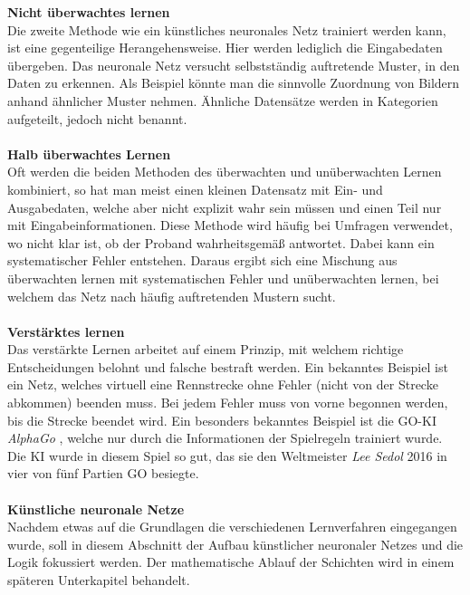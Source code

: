 \documentclass[a4paper,12pt,oneside]{article}
\begin{document}
\textbf{Nicht überwachtes lernen}\\
Die zweite Methode wie ein künstliches neuronales Netz trainiert werden kann, ist eine gegenteilige Herangehensweise. Hier werden lediglich die Eingabedaten übergeben. Das neuronale Netz versucht selbstständig auftretende Muster, in den Daten zu erkennen. Als Beispiel könnte man die sinnvolle Zuordnung von Bildern anhand ähnlicher Muster nehmen. Ähnliche Datensätze werden in Kategorien aufgeteilt, jedoch nicht benannt.\\\\
\textbf{Halb überwachtes Lernen}\\
Oft werden die beiden Methoden des überwachten und unüberwachten Lernen kombiniert, so hat man meist einen kleinen Datensatz mit Ein- und Ausgabedaten, welche aber nicht explizit wahr sein müssen und einen Teil nur mit Eingabeinformationen. Diese Methode wird häufig bei Umfragen verwendet, wo nicht klar ist, ob der Proband wahrheitsgemäß antwortet. Dabei kann ein systematischer Fehler entstehen. Daraus ergibt sich eine Mischung aus überwachten lernen mit systematischen Fehler und unüberwachten lernen, bei welchem das Netz nach häufig auftretenden Mustern sucht.\\\\
\textbf{Verstärktes lernen}\\ 
Das verstärkte Lernen arbeitet auf einem Prinzip, mit welchem richtige Entscheidungen belohnt und falsche bestraft werden. Ein bekanntes Beispiel ist ein Netz, welches virtuell eine Rennstrecke ohne Fehler (nicht von der Strecke abkommen) beenden muss. Bei jedem Fehler muss von vorne begonnen werden, bis die Strecke beendet wird. Ein besonders bekanntes Beispiel ist die GO-KI \textit{AlphaGo} \cite{Alpha2016GO}, welche nur durch die Informationen der Spielregeln trainiert wurde. Die KI wurde in diesem Spiel so gut, das sie den Weltmeister \textit{Lee Sedol} 2016 in vier von fünf Partien GO besiegte.\\\\
\textbf{Künstliche neuronale Netze}\\
Nachdem etwas auf die Grundlagen die verschiedenen Lernverfahren eingegangen wurde, soll in diesem Abschnitt der Aufbau künstlicher neuronaler Netzes und die Logik fokussiert werden. Der mathematische Ablauf der Schichten wird in einem späteren Unterkapitel behandelt.\\
\end{document}
